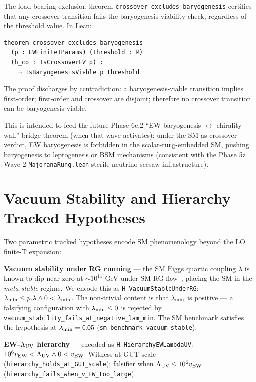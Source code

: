 \documentclass[aps,prd,twocolumn,showpacs,superscriptaddress,nofootinbib]{revtex4-2}
\begin{document}
The load-bearing exclusion theorem
\texttt{crossover\_excludes\_baryogenesis} certifies that any
crossover transition fails the baryogenesis viability check, regardless
of the threshold value. In Lean:
\begin{verbatim}
theorem crossover_excludes_baryogenesis
  (p : EWFiniteTParams) (threshold : ℝ)
  (h_co : IsCrossoverEW p) :
    ¬ IsBaryogenesisViable p threshold
\end{verbatim}
The proof discharges by contradiction: a baryogenesis-viable transition
implies first-order; first-order and crossover are disjoint; therefore
no crossover transition can be baryogenesis-viable.

This is intended to feed the future Phase 6c.2 ``EW
baryogenesis $\leftrightarrow$ chirality wall'' bridge theorem (when
that wave activates): under
the SM-as-crossover verdict, EW baryogenesis is forbidden in the
scalar-rung-embedded SM, pushing baryogenesis to leptogenesis or BSM
mechanisms (consistent with the Phase 5z Wave 2 \texttt{MajoranaRung.lean}
sterile-neutrino seesaw infrastructure).

\section{Vacuum Stability and Hierarchy Tracked Hypotheses}
\label{sec:tracked-hypotheses}

Two parametric tracked hypotheses encode SM phenomenology beyond the
LO finite-T expansion:

\textbf{Vacuum stability under RG running} — the SM Higgs quartic
coupling $\lambda$ is known to dip near zero at $\sim 10^{11}$ GeV
under SM RG flow~\cite{ButtazzoEtAl2013}, placing the SM in the
\textit{meta-stable} regime. We encode this as
\texttt{H\_VacuumStableUnderRG}:
$\lambda_{\rm min} \le p.\lambda \land 0 < \lambda_{\rm min}$. The
non-trivial content is that $\lambda_{\rm min}$ is positive — a
falsifying configuration with $\lambda_{\rm min} \le 0$ is rejected by
\texttt{vacuum\_stability\_fails\_at\_negative\_lam\_min}. The SM
benchmark satisfies the hypothesis at $\lambda_{\rm min} = 0.05$
(\texttt{sm\_benchmark\_vacuum\_stable}).

\textbf{EW-$\Lambda_{\rm UV}$ hierarchy} — encoded as
\texttt{H\_HierarchyEWLambdaUV}:
$10^6 v_{\rm EW} < \Lambda_{\rm UV} \land 0 < v_{\rm EW}$. Witness at
GUT scale (\texttt{hierarchy\_holds\_at\_GUT\_scale}); falsifier when
$\Lambda_{\rm UV} \le 10^6 v_{\rm EW}$
(\texttt{hierarchy\_fails\_when\_v\_EW\_too\_large}).
\end{document}
